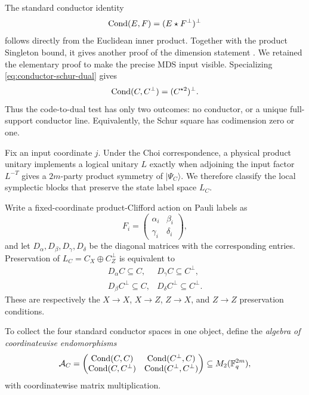 The standard conductor identity
\begin{equation}\label{eq:conductor-schur-dual}
 \operatorname{Cond}(E,F)=(E\star F^\perp)^\perp
\end{equation}
follows directly from the Euclidean inner product.  Together with the product
Singleton bound, it gives another proof of the dimension statement
\cite{CouvreurMarquezCorbellaPellikaan2017,MirandolaZemor2015}.  We retained
the elementary proof to make the precise MDS input visible.  Specializing
\eqref{eq:conductor-schur-dual} gives
\begin{equation}\label{eq:dual-conductor-schur-square}
 \operatorname{Cond}(C,C^\perp)=(C^{\star2})^\perp.
\end{equation}
Thus the code-to-dual test has only two outcomes: no conductor, or a unique
full-support conductor line.  Equivalently, the Schur square has codimension
zero or one.

Fix an input coordinate \(j\).  Under the Choi correspondence, a physical
product unitary implements a logical unitary \(L\) exactly when adjoining the
input factor \(L^{-T}\) gives a \(2m\)-party product symmetry of
\(\lvert\Psi_C\rangle\).  We therefore classify the local symplectic blocks
that preserve the state label space \(L_C\).

Write a fixed-coordinate product-Clifford action on Pauli labels as
\[
 F_i=\begin{pmatrix}\alpha_i&\beta_i\\
                     \gamma_i&\delta_i\end{pmatrix},
\]
and let \(D_\alpha,D_\beta,D_\gamma,D_\delta\) be the diagonal
matrices with the corresponding entries.  Preservation of
\(L_C=C_X\oplus C^\perp_Z\) is equivalent to
\begin{equation}\label{eq:block-preservation}
\begin{array}{ll}
D_\alpha C\subseteq C,&D_\gamma C\subseteq C^\perp,\\
D_\beta C^\perp\subseteq C,&D_\delta C^\perp\subseteq C^\perp.
\end{array}
\end{equation}
These are respectively the \(X\mathbin\to X\), \(X\mathbin\to Z\),
\(Z\mathbin\to X\), and \(Z\mathbin\to Z\) preservation conditions.

To collect the four standard conductor spaces in one object, define the
\emph{algebra of coordinatewise endomorphisms}
\begin{equation}\label{eq:css-endomorphism-algebra}
 \mathcal A_C=
 \begin{pmatrix}
  \operatorname{Cond}(C,C)&\operatorname{Cond}(C^\perp,C)\\
  \operatorname{Cond}(C,C^\perp)&\operatorname{Cond}(C^\perp,C^\perp)
 \end{pmatrix}
 \subseteq M_2(\mathbb F_q^{2m}),
\end{equation}
with coordinatewise matrix multiplication.


